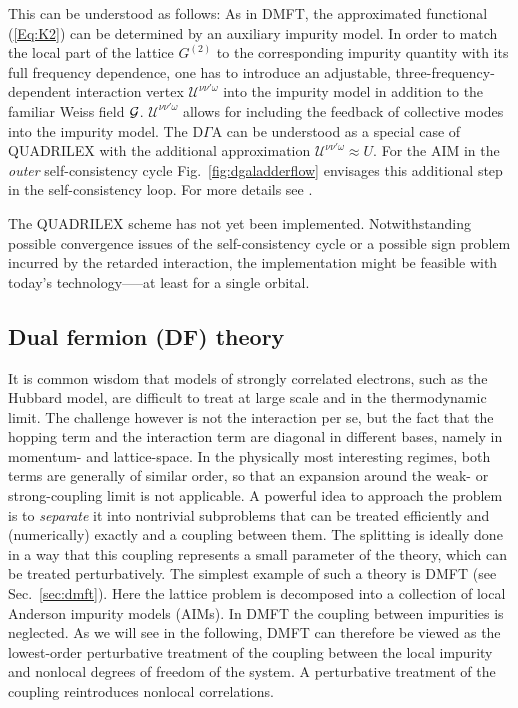 \documentclass[rmp,aps,reprint,amsmath,amssymb,superscriptaddress,showpacs,nofootinbib]{revtex4-1}
\begin{document}
This can be understood as follows: As in DMFT, the approximated functional (\ref{Eq:K2}) can be determined by an auxiliary impurity model. In order to match the local part of the lattice $G^{(2)}$ to the corresponding impurity quantity with its full frequency dependence, one has to introduce an adjustable, three-frequency-dependent interaction vertex  $\mathcal{U}^{\nu\nu'\omega}$ into the impurity model in addition to the familiar Weiss field ${\cal G}$. $\mathcal{U}^{\nu\nu'\omega}$ allows for including the feedback of collective modes into the impurity model. The  D$\Gamma$A can be understood as a special case of QUADRILEX with the additional approximation $\mathcal{U}^{\nu\nu'\omega}\approx U$. For the AIM in the {\sl outer} self-consistency cycle Fig.~\ref{fig:dgaladderflow} envisages this additional step in the self-consistency loop. For more details see .

The QUADRILEX scheme has not yet been implemented. Notwithstanding possible convergence issues of the self-consistency cycle or a possible sign problem incurred by the retarded interaction, the implementation might be feasible with today's technology—--at least for
a single orbital.

\subsection{Dual fermion (DF) theory}
\label{sec:funcint}

It is common wisdom that models of strongly correlated electrons, such as the Hubbard model, are difficult to treat at large scale and in the thermodynamic limit. The challenge however is not the interaction per se, but the fact that the hopping term and the interaction term are diagonal in different bases, namely in momentum- and lattice-space. In the physically most interesting regimes, both terms are generally of similar order, so that an expansion around the weak- or strong-coupling limit is not applicable. A powerful idea to  approach the problem is to {\sl separate} it into nontrivial subproblems that can be treated efficiently and (numerically) exactly and a coupling between them. The splitting is ideally done in a way that this coupling represents a small parameter of the theory, which can be treated perturbatively. The simplest example of such a theory is DMFT (see Sec.~\ref{sec:dmft}). Here the lattice problem is decomposed into a collection of local Anderson impurity models (AIMs).  In DMFT the coupling between impurities is neglected. As we will see in the following, DMFT can therefore be viewed as the lowest-order perturbative treatment of the coupling between the local impurity and nonlocal degrees of freedom of the system. A perturbative treatment of the coupling reintroduces nonlocal correlations.
\end{document}
